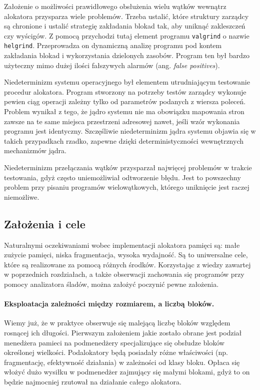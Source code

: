 \documentclass[12pt,a4paper,titlepage,twoside]{mwart}
\begin{document}
Założenie o możliwości prawidłowego obsłużenia wielu wątków wewnątrz alokatora
przysparza wiele problemów. Trzeba ustalić, które struktury zarządcy są
chronione i ustalić strategię zakładania blokad tak, aby uniknąć zakleszczeń
czy wyścigów. Z pomocą przychodzi tutaj element programu \verb+valgrind+ o
nazwie \verb+helgrind+. Przeprowadza on dynamiczną analizę programu pod kontem
zakładania blokad i wykorzystania dzielonych zasobów. Program ten był bardzo
użyteczny mimo dużej ilości fałszywych alarmów (ang. \textit{false positives}).

Niedeterminizm systemu operacyjnego był elementem utrudniającym testowanie
procedur alokatora. Program stworzony na potrzeby testów zarządcy wykonuje
pewien ciąg operacji zależny tylko od parametrów podanych z wiersza poleceń.
Problem wynikał z tego, że jądro systemu nie ma obowiązku mapowania stron
zawsze na te same miejsca przestrzeni adresowej nawet, jeśli wzór wykonania
programu jest identyczny.  Szczęśliwie niedeterminizm jądra systemu objawia się
w takich przypadkach rzadko, zapewne dzięki deterministyczności wewnętrznych
mechanizmów jądra.
	
Niedeterminizm przełączania wątków przysparzał najwięcej problemów w trakcie
testowania, gdyż często uniemożliwiał odtworzenie błędu. Jest to powszechny
problem przy pisaniu programów wielowątkowych, którego uniknięcie jest raczej
niemożliwe.

\subsection{Założenia i cele}

Naturalnymi oczekiwaniami wobec implementacji alokatora pamięci są: małe
zużycie pamięci, niska fragmentacja, wysoka wydajność. Są to uniwersalne cele,
które są realizowane za pomocą różnych środków. Korzystając z wiedzy zawartej w
poprzednich rozdziałach, a także obserwacji zachowania się programów przy
pomocy analizatora śladów, można założyć poczynić pewne założenia.

\paragraph{Eksploatacja zależności między rozmiarem, a liczbą bloków.} Wiemy
już, że w praktyce obserwuje się malejącą liczbę bloków względem rosnącej ich
długości. Pierwszym założeniem jakie zostało obrane jest podział menedżera
pamieci na podmenedżery specjalizujące się obsłudze bloków określonej
wielkości. Podalokatory będą posiadały różne właściwości (np. fragmentację,
efektywność działania) w zależności od klasy bloku. Opłaca się włożyć dużo
wysiłku w podmenedżer zajmujący się małymi blokami, gdyż to on będzie
najmocniej rzutował na działanie całego alokatora.
\end{document}
